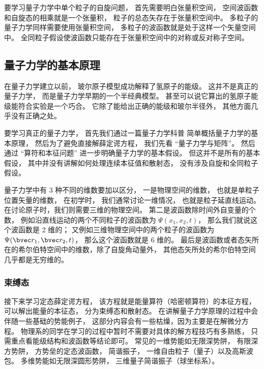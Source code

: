 要学习量子力学中单个粒子的自旋问题， 首先需要明白张量积空间， 空间波函数和自旋态的相乘就是一个张量积， 粒子的总态矢存在于张量积空间中。 多粒子的量子力学同样需要使用张量积空间， 多粒子的波函数就是处于这样一个矢量空间中。 全同粒子假设使波函数只能存在于张量积空间中的对称或反对称子空间。

\subsection{量子力学的基本原理}

在量子力学建立以前， 玻尔原子模型成功解释了氢原子的能级。 这并不是真正的量子力学， 而是量子力学早期的一个半经典模型。 甚至可以说它算出的氢原子能级能符合实验是一个巧合。 它除了能给出正确的能级和玻尔半径外， 其他方面几乎没有正确之处。

要学习真正的量子力学， 首先我们通过一篇量子力学科普 简单概括量子力学的基本原理， 然后为了避免直接解薛定谔方程， 我们先看 “量子力学与矩阵”。 然后通过 “算符和本征问题” 进一步明确量子力学的基本假设。 但这并不是所有的基本假设， 其中并没有讲解如何处理连续本征值和散射态， 没有涉及自旋和全同粒子假设。

量子力学中有 3 种不同的维数要加以区分， 一是物理空间的维数， 也就是单粒子位置矢量的维数， 在初学时， 我们通常讨论一维情况， 也就是粒子延直线运动。 在讨论原子时，我们则需要三维的物理空间。 第二是波函数除时间外自变量的个数， 例如沿直线运动的两个不同粒子的波函数为 $\Psi(x_1,x_2,t)$， 那么我们就说这个波函数是 2 维的； 又例如三维物理空间中的两个粒子的波函数为 $\Psi(\bvec r_1, \bvec r_2, t)$， 那么这个波函数就是 6 维的。 最后是波函数或者态矢所在的希尔伯特空间中的维数，除了自旋角动量外， 其他态矢所处的希尔伯特空间几乎都是无穷维的。

\subsubsection{束缚态}
接下来学习定态薛定谔方程， 该方程就是能量算符（哈密顿算符）的本征方程， 可以解出能量的本征态， 分为束缚态和散射态。 在讲解量子力学原理的过程中会伴随一些基础的势能例子， 这部分内容会有一些枯燥，因为主要是在解微分方程。 物理系的同学在学习的过程中暂时不需要对具体的解方程技巧有多熟练， 只需重点看能级结构和波函数等结论即可。 常见的一维势能如无限深势阱， 有限深方势阱， 方势垒的定态波函数， 简谐振子， 一维自由粒子（量子）以及高斯波包。 多维势能如无限深圆形势阱， 三维量子简谐振子（球坐标系）。

